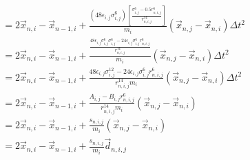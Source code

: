 \documentclass{article}
\begin{document}
\begin{align}
	&=2\vec{x}_{n,i}-\vec{x}_{n-1,i}+\frac{\left(48\epsilon_{i,j}\sigma_{i,j}^{6}\right)\left[\frac{\sigma_{i,j}^{6}-0.5r_{n,i,j}^6}{r_{n,i,j}^{14}}\right]}{m_i}\left(\vec{x}_{n,j}-\vec{x}_{n,i}\right)\Delta t^2\\
	&=2\vec{x}_{n,i}-\vec{x}_{n-1,i}+\frac{\frac{48\epsilon_{i,j}\sigma_{i,j}^{6}\sigma_{i,j}^{6}-24\epsilon_{i,j}\sigma_{i,j}^{6}r_{n,i,j}^6}{r_{n,i,j}^{14}}}{m_i}\left(\vec{x}_{n,j}-\vec{x}_{n,i}\right)\Delta t^2\\
	&=2\vec{x}_{n,i}-\vec{x}_{n-1,i}+\frac{48\epsilon_{i,j}\sigma_{i,j}^{12}-24\epsilon_{i,j}\sigma_{i,j}^{6}r_{n,i,j}^6}{r_{n,i,j}^{14}m_i}\left(\vec{x}_{n,j}-\vec{x}_{n,i}\right)\Delta t^2\\
	&=2\vec{x}_{n,i}-\vec{x}_{n-1,i}+\frac{A_{i,j}-B_{i,j}r_{n,i,j}^6}{r_{n,i,j}^{14}m_i}\left(\vec{x}_{n,j}-\vec{x}_{n,i}\right)\\
	&=2\vec{x}_{n,i}-\vec{x}_{n-1,i}+\frac{s_{n,i,j}}{m_i}\left(\vec{x}_{n,j}-\vec{x}_{n,i}\right)\\
	&=2\vec{x}_{n,i}-\vec{x}_{n-1,i}+\frac{s_{n,i,j}}{m_i}\vec{d}_{n,i,j}\\
\end{align}
\end{document}
